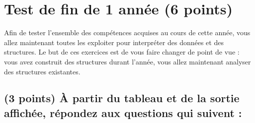 \documentclass[11pt,a4paper]{article}
\begin{document}
\section{Test de fin de 1 année (6 points)}


\noindent Afin de tester l'ensemble des compétences acquises au cours de cette année, vous allez maintenant toutes les exploiter pour interpréter des données et des structures.
Le but de ces exercices est de vous faire changer de point de vue : vous avez construit des structures durant l'année, vous allez maintenant analyser des structures existantes.


\subsection{(3 points) \`A partir du tableau et de la sortie affichée, répondez aux questions qui suivent : }
\end{document}
